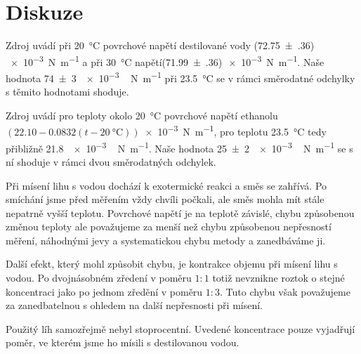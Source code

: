 \section*{Diskuze}
Zdroj \cite{napetivoda} uvádí při \SI{20}{\degreeCelsius} povrchové napětí destilované vody (\num{72.75(36)})\,\SI{e-3}{\newton\per\metre} a při \SI{30}{\degreeCelsius} napětí\linebreak (\num{71.99(36)})\,\SI{e-3}{\newton\per\metre}.
Naše hodnota 
\SI{74(3)}{\num{e-3}\,\newton \per \metre}
při \SI{23.5}{\degreeCelsius} se v rámci směrodatné odchylky s těmito hodnotami shoduje.

Zdroj \cite{napetiethanol} uvádí pro teploty okolo \SI{20}{\degreeCelsius} povrchové napětí ethanolu $(\num{22.10} - \num{0.0832}(t- \SI{20}{\degreeCelsius}))$\SI{e-3}{\newton\per\metre}, pro teplotu \SI{23.5}{\degreeCelsius} tedy přibližně \SI{21.8}{\num{e-3}\,\newton \per \metre}.
Naše hodnota \SI{25(2)}{\num{e-3}\,\newton \per \metre} se s ní shoduje v rámci dvou směrodatných odchylek.

Při mísení lihu s vodou dochází k exotermické reakci a směs se zahřívá.
Po smíchání jsme před měřením vždy chvíli počkali, ale směs mohla mít stále nepatrně vyšší teplotu.
Povrchové napětí je na teplotě závislé, chybu způsobenou změnou teploty ale považujeme za menší než chybu způsobenou nepřesností měření, náhodnými jevy a systematickou chybu metody a zanedbáváme ji. 

Další efekt, který mohl způsobit chybu, je kontrakce objemu při mísení lihu s vodou.
Po dvojnásobném zředení v poměru $1:1$ totiž nevznikne roztok o stejné koncentraci jako po jednom zředění v poměru $1:3$.
Tuto chybu však považujeme za zanedbatelnou s ohledem na další nepřesnosti při mísení.

Použitý líh samozřejmě nebyl stoprocentní.
Uvedené koncentrace pouze vyjadřují poměr, ve kterém jsme ho mísili s destilovanou vodou.